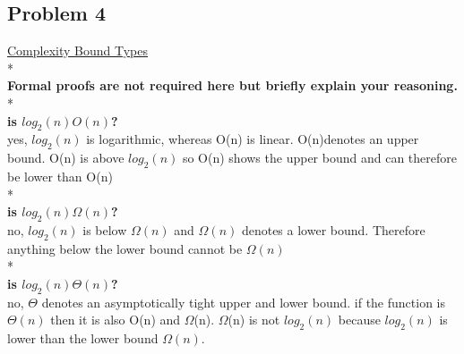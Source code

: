 \documentclass[11pt]{article}
\begin{document}
\begin{itemize}
\section*{Problem 4} 
	{\underline{Complexity Bound Types}}\\*\\
	{\bf Formal proofs are not required here but briefly explain your reasoning.}\\*\\
{\bf is $log_{2}(n) O(n)$?}\\
yes, $log_{2}(n)$ is logarithmic, whereas O(n) is linear. O(n)denotes an upper bound. O(n) is above $log_{2}(n)$ so O(n) shows the upper bound and can therefore be lower than O(n)\\*\\
{\bf is $log_{2}(n) \Omega(n)$?}\\
no, $log_{2}(n)$ is below $\Omega(n)$ and $\Omega(n)$ denotes a lower bound. Therefore anything below the lower bound cannot be $\Omega(n)$\\*\\
{\bf is $log_{2}(n) \Theta(n)$?}\\
no, $\Theta$ denotes an asymptotically tight upper and lower bound. if the function is $\Theta(n)$ then it is also O(n) and $\Omega$(n). $\Omega$(n) is not $log_{2}(n)$ because $log_{2}(n)$ is lower than the lower bound $\Omega(n)$.	

\pagebreak


\end{itemize}
\end{document}

